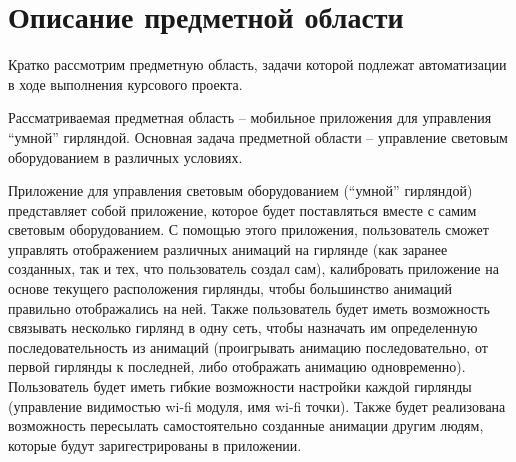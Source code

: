 \section{Описание предметной области}
\label{sec:analysis}

Кратко рассмотрим предметную область, задачи которой подлежат автоматизации в ходе выполнения курсового проекта.

Рассматриваемая предметная область – мобильное приложения для управления ``умной'' гирляндой. Основная задача предметной области – управление световым оборудованием в различных условиях.

Приложение для управления световым оборудованием (``умной'' гирляндой) представляет собой приложение, которое будет поставляться вместе с самим световым оборудованием. С помощью этого приложения, пользователь сможет управлять отображением различных анимаций на гирлянде (как заранее созданных, так и тех, что пользователь создал сам), калибровать приложение на основе текущего расположения гирлянды, чтобы большинство анимаций правильно отображались на ней. Также пользователь будет иметь возможность связывать несколько гирлянд в одну сеть, чтобы назначать им определенную последовательность из анимаций (проигрывать анимацию последовательно, от первой гирлянды к последней, либо отображать анимацию одновременно). Пользователь будет иметь гибкие возможности настройки каждой гирлянды (управление видимостью wi-fi модуля, имя wi-fi точки). Также будет реализована возможность пересылать самостоятельно созданные анимации другим людям, которые будут заригестрированы в приложении.




%


